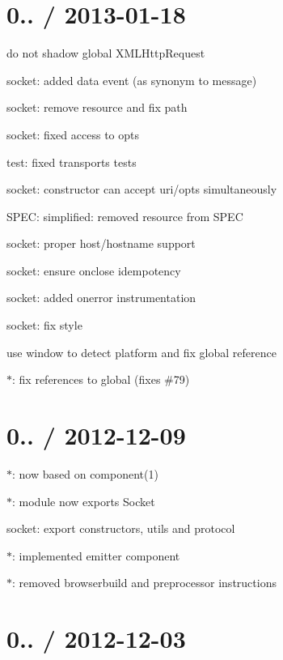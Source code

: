 \section*{0.. / 2013-\/01-\/18 }


\begin{DoxyItemize}
\item do not shadow global X\+M\+L\+Http\+Request
\item socket\+: added {\ttfamily data} event (as synonym to {\ttfamily message})
\item socket\+: remove {\ttfamily resource} and fix {\ttfamily path}
\item socket\+: fixed access to {\ttfamily opts}
\item test\+: fixed transports tests
\item socket\+: constructor can accept uri/opts simultaneously
\item S\+P\+EC\+: simplified\+: removed resource from S\+P\+EC
\item socket\+: proper {\ttfamily host}/{\ttfamily hostname} support
\item socket\+: ensure {\ttfamily onclose} idempotency
\item socket\+: added {\ttfamily onerror} instrumentation
\item socket\+: fix style
\item use window to detect platform and fix global reference
\item $\ast$\+: fix references to {\ttfamily global} (fixes \#79)
\end{DoxyItemize}

\section*{0.. / 2012-\/12-\/09 }


\begin{DoxyItemize}
\item $\ast$\+: now based on {\ttfamily component(1)}
\item $\ast$\+: module now exports {\ttfamily Socket}
\item socket\+: export constructors, utils and {\ttfamily protocol}
\item $\ast$\+: implemented {\ttfamily emitter} component
\item $\ast$\+: removed browserbuild and preprocessor instructions
\end{DoxyItemize}

\section*{0.. / 2012-\/12-\/03 }



